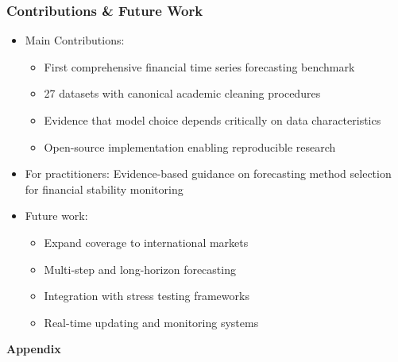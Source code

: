 \documentclass[ignorenonframetext, 9pt]{beamer}
\begin{document}
\begin{frame}
  \frametitle{Contributions \& Future Work}
  \begin{itemize}
  \item \alert{Main Contributions:}
  \begin{itemize}
    \item First comprehensive financial time series forecasting benchmark
    \item 27 datasets with canonical academic cleaning procedures
    \item Evidence that model choice depends critically on data characteristics
    \item Open-source implementation enabling reproducible research
  \end{itemize}
  \vspace{0.3cm}
  \item \alert{For practitioners:} Evidence-based guidance on forecasting method selection for financial stability monitoring
  \vspace{0.3cm}
  \item \alert{Future work:}
  \begin{itemize}
    \item Expand coverage to international markets
    \item Multi-step and long-horizon forecasting
    \item Integration with stress testing frameworks
    \item Real-time updating and monitoring systems
  \end{itemize}
  \end{itemize}
\end{frame}

\appendix
\begin{frame}
  \centering
  \textbf{Appendix}
\end{frame}
\end{document}
